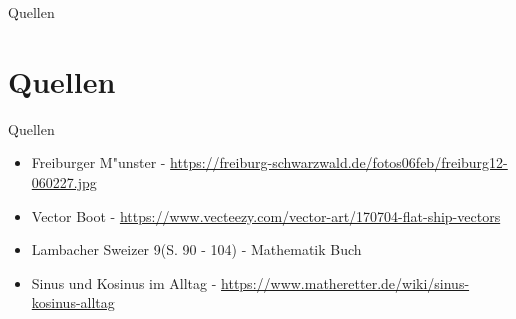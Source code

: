 \documentclass{standalone}
\begin{document}
\begin{frame}
  \begin{center}
    Quellen
  \end{center}
  \section{Quellen}
\end{frame}

\begin{frame}{Quellen}
  \begin{itemize}
    \item Freiburger M{"u}nster - \url{https://freiburg-schwarzwald.de/fotos06feb/freiburg12-060227.jpg}
    \item Vector Boot - \url{https://www.vecteezy.com/vector-art/170704-flat-ship-vectors}
    \item Lambacher Sweizer 9(S. 90 - 104) - Mathematik Buch
    \item Sinus und Kosinus im Alltag - \url{https://www.matheretter.de/wiki/sinus-kosinus-alltag}
  \end{itemize}
\end{frame}
\end{document}
